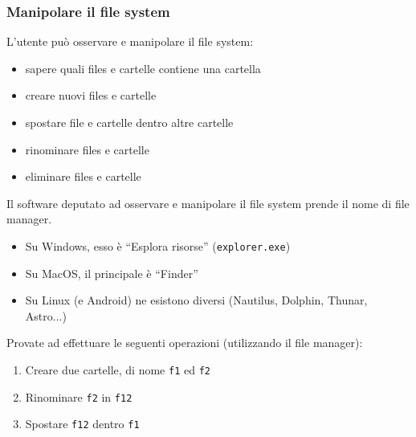 \documentclass{beamer}
\begin{document}
\begin{frame}[fragile]
\frametitle{Manipolare il file system}
L'utente può osservare e manipolare il file system:
\begin{itemize}
 \item sapere quali files e cartelle contiene una cartella
 \item creare nuovi files e cartelle
 \item spostare file e cartelle dentro altre cartelle
 \item rinominare files e cartelle
 \item eliminare files e cartelle
\end{itemize}
Il software deputato ad osservare e manipolare il file system prende il nome di \alert{file manager}.
\begin{itemize}
 \item Su Windows, esso è ``Esplora risorse'' (\texttt{explorer.exe})
 \item Su MacOS, il principale è ``Finder''
 \item Su Linux (e Android) ne esistono diversi (Nautilus, Dolphin, Thunar, Astro...)
\end{itemize}
Provate ad effettuare le seguenti operazioni (utilizzando il file manager):
\begin{enumerate}
 \item Creare due cartelle, di nome \texttt{f1} ed \texttt{f2}
 \item Rinominare \texttt{f2} in \texttt{f12}
 \item Spostare \texttt{f12} dentro \texttt{f1}
\end{enumerate}
\end{frame}
\end{document}
